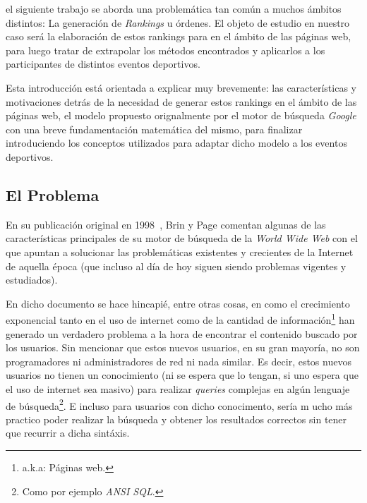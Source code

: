 \par {} el siguiente trabajo se aborda una problem\'atica tan
com\'un a muchos \'ambitos distintos: La generaci\'on de \textit{Rankings} u
\'ordenes. El objeto de estudio en nuestro caso ser\'a la elaboraci\'on de estos
rankings para en el \'ambito de las p\'aginas web, para luego tratar de
extrapolar los m\'etodos encontrados y aplicarlos a los participantes de
distintos eventos deportivos.

\par Esta introducci\'on est\'a orientada a explicar muy brevemente: las
caracter\'isticas y motivaciones detr\'as de la necesidad de generar estos
rankings en el \'ambito de las p\'aginas web, el modelo propuesto orignalmente
por el motor de b\'usqueda \emph{Google} con una breve fundamentaci\'on
matem\'atica del mismo, para finalizar introduciendo los conceptos utilizados
para adaptar dicho modelo a los eventos deportivos.

\subsection{El Problema}
\par En su publicaci\'on original en 1998~\cite{Brin1998}, Brin y Page comentan
algunas de las caracter\'isticas principales de su motor de b\'usqueda de la
\emph{World Wide Web} con el que apuntan a solucionar las problem\'aticas
existentes y crecientes de la Internet de aquella \'epoca (que incluso al d\'ia
de hoy siguen siendo problemas vigentes y estudiados).

\par En dicho documento se hace hincapi\'e, entre otras cosas, en como el
crecimiento exponencial tanto en el uso de internet como de la cantidad de
informaci\'on\footnote{a.k.a: P\'aginas web.} han generado un verdadero problema
a la hora de encontrar el contenido buscado por los usuarios. Sin mencionar que
estos nuevos usuarios, en su gran mayor\'ia, no son programadores ni
administradores de red ni nada similar. Es decir, estos nuevos usuarios no
tienen un conocimiento (ni se espera que lo tengan, si uno espera que el uso de
internet sea masivo) para realizar \emph{queries} complejas en alg\'un lenguaje
de b\'usqueda\footnote{Como por ejemplo \emph{ANSI SQL}.}. E incluso para
usuarios con dicho conocimento, ser\'ia m ucho m\'as practico poder realizar la
b\'usqueda y obtener los resultados correctos sin tener que recurrir a dicha
sint\'axis.

